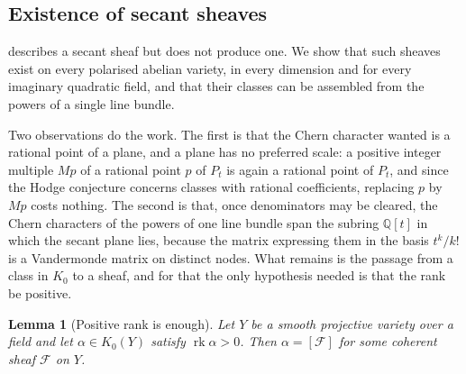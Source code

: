 \documentclass[11pt,reqno]{amsart}
\theoremstyle{plain}
\newtheorem{lemma}[theorem]{Lemma}
\theoremstyle{definition}
\theoremstyle{remark}
\newcommand{\QQ}{\mathbb{Q}}
\newcommand{\cF}{\mathcal{F}}
\DeclareMathOperator{\rk}{rk}
\begin{document}
\subsection{Existence of secant sheaves}\label{ssec:thirdexists}

 describes a secant sheaf but does not produce one.
We show that such sheaves exist on every polarised abelian variety, in
every dimension and for every imaginary quadratic field, and that their
classes can be assembled from the powers of a single line bundle.

Two observations do the work. The first is that the Chern character wanted is
a rational point of a plane, and a plane has no preferred scale: a positive
integer multiple $Mp$ of a rational point $p$ of $P_{t}$ is again a rational
point of $P_{t}$, and since the Hodge conjecture concerns classes with
rational coefficients, replacing $p$ by $Mp$ costs nothing. The second is
that, once denominators may be cleared, the Chern characters of the powers of
one line bundle span the subring $\QQ[t]$ in which the secant plane lies,
because the matrix expressing them in the basis $t^{k}/k!$ is a Vandermonde
matrix on distinct nodes. What remains is the passage from a class in $K_{0}$
to a sheaf, and for that the only hypothesis needed is that the rank be
positive.

\begin{lemma}[Positive rank is enough]\label{lem:posrank}
Let $Y$ be a smooth projective variety over a field and let $\alpha\in
K_{0}(Y)$ satisfy $\rk\alpha>0$. Then $\alpha=[\cF]$ for some coherent sheaf
$\cF$ on $Y$.
\end{lemma}
\end{document}
